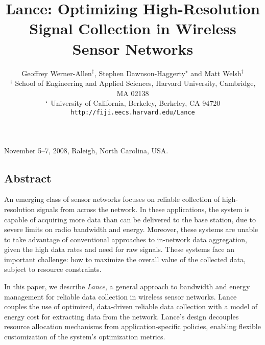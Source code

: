 \documentclass[lettersize]{sig-alternate-konrad}
\begin{document}

 {November 5--7, 2008, Raleigh, North Carolina, USA.} 

\title{{\ttlfnt Lance: Optimizing High-Resolution Signal Collection
in Wireless Sensor Networks}}
\author{\alignauthor Geoffrey Werner-Allen$^\dag$, Stephen
Dawnson-Haggerty$^\star$ and Matt Welsh$^\dag$\\
{\affaddr $^\dag$ School of Engineering and
Applied Sciences, Harvard
University, Cambridge, MA 02138} \\
{\affaddr $^\star$ University of California, Berkeley, Berkeley, CA 94720} \\
{\affaddr \texttt{http://fiji.eecs.harvard.edu/Lance}}}
\maketitle

\maketitle
\thispagestyle{empty}


\subsection*{Abstract}
An emerging class of sensor networks focuses on reliable 
collection of high-resolution signals from across the network.
In these applications, the system is capable of acquiring more 
data than can be delivered to the base station, 
due to severe limits on radio bandwidth and energy.
Moreover, these systems are unable 
to take advantage of conventional approaches to in-network data
aggregation, given the high data rates and need for raw signals.
These systems face an important challenge: how to
maximize the overall value of the collected data, subject to resource constraints.

In this paper, we describe {\em Lance}, a general approach to
bandwidth and energy management for reliable data collection in wireless
sensor networks. Lance couples the use of optimized, data-driven 
reliable data collection with a model of energy cost for extracting 
data from the network. Lance's design decouples resource allocation 
mechanisms from application-specific policies, enabling flexible 
customization of the system's optimization metrics.
\end{document}
